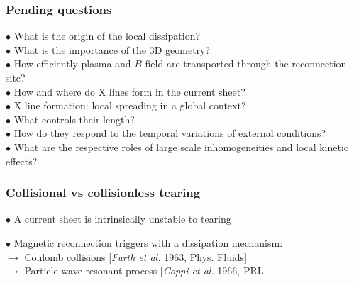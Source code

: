 \documentclass{beamer}
\begin{document}
\begin{frame}
\frametitle{Pending questions}

$\bullet$ What is the origin of the local dissipation? \\[0.3cm]
$\bullet$ What is the importance of the 3D geometry? \\[0.3cm]
$\bullet$ How efficiently plasma and $B$-field are transported through the reconnection site? \\[0.3cm]
$\bullet$ How and where do X lines form in the current sheet? \\[0.3cm]
$\bullet$ X line formation: local spreading in a global context? \\[0.3cm]
$\bullet$ What controls their length? \\[0.3cm]
$\bullet$ How do they respond to the temporal variations of external conditions? \\[0.3cm]
$\bullet$ What are the respective roles of large scale inhomogeneities and local kinetic effects? \\[0.3cm]

\end{frame}



\begin{frame}
\frametitle{Collisional vs collisionless tearing}

$\bullet$ A current sheet is intrinsically unstable to tearing

\begin{center}

\end{center}

$\bullet$ Magnetic reconnection triggers with a dissipation mechanism: \\[0.4cm]
$\to$ Coulomb collisions [\textit{Furth et al.} 1963, Phys. Fluids] \\
$\to$ Particle-wave resonant process [\textit{Coppi et al.} 1966, PRL]


\end{frame}
\end{document}
